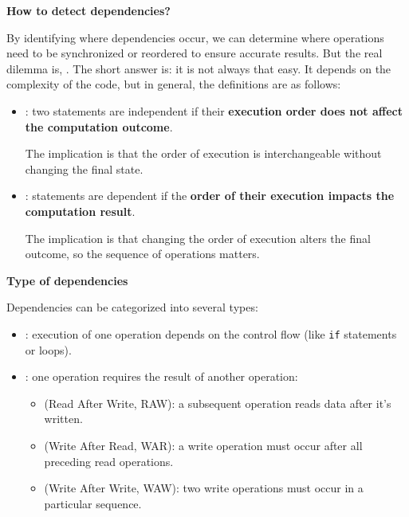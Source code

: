 \newpage

\begin{flushleft}
    \textcolor{Green3}{ \textbf{How to detect dependencies?}}
\end{flushleft}
By identifying where dependencies occur, we can determine where operations need to be synchronized or reordered to ensure accurate results. But the real dilemma is, . The short answer is: it is not always that easy. It depends on the complexity of the code, but in general, the definitions are as follows:
\begin{itemize}
    \item {}: two statements are independent if their \textbf{execution order does not affect the computation outcome}.

    The implication is that the order of execution is interchangeable without changing the final state.


    \item {}: statements are dependent if the \textbf{order of their execution impacts the computation result}.

    The implication is that changing the order of execution alters the final outcome, so the sequence of operations matters.
\end{itemize}

\highspace
\begin{flushleft}
    \textcolor{Green3}{ \textbf{Type of dependencies}}
\end{flushleft}
Dependencies can be categorized into several types:
\begin{itemize}
    \item {}: execution of one operation depends on the control flow (like \texttt{if} statements or loops).

    \item {}: one operation requires the result of another operation:
    \begin{itemize}
        \item {} (Read After Write, RAW): a subsequent operation reads data after it's written.
        \item {} (Write After Read, WAR): a write operation must occur after all preceding read operations.
        \item {} (Write After Write, WAW): two write operations must occur in a particular sequence.
    \end{itemize}
\end{itemize}

